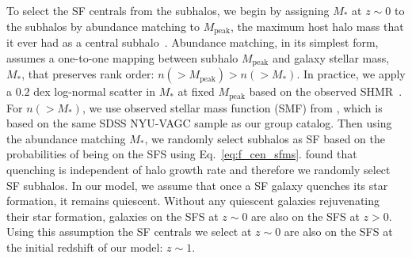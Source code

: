 \documentclass[12pt, letterpaper, preprint, tighten]{aastex62}
\begin{document}
To select the SF centrals from the subhalos, we begin by assigning $M_*$
at $z\sim 0$ to the subhalos by abundance matching to $M_\mathrm{peak}$,
the maximum host halo mass that it ever had as a central subhalo~\citep{conroy2006,vale2006,yang2009,wetzel2012,leja2013,wetzel2013,wetzel2014,hahn2017b}.
Abundance matching, in its simplest form, assumes a one-to-one mapping between subhalo
$M_\mathrm{peak}$ and galaxy stellar mass, $M_*$, that preserves rank
order: $n({>}M_\mathrm{peak}) > n({>}M_*)$. In practice, we apply a $0.2$
dex log-normal scatter in $M_*$ at fixed $M_\mathrm{peak}$ based on the
observed SHMR~\citep[\emph{e.g.}][]{mandelbaum2006a, more2011, velander2014, zu2015, gu2016, lange2018a}.
For $n({>}M_*)$, we use observed stellar mass function (SMF)
from \cite{li2009}, which is based on the same SDSS NYU-VAGC sample as our
group catalog. Then using the abundance matching $M_*$, we randomly select subhalos as
SF based on the probabilities of being on the SFS using Eq.~\ref{eq:f_cen_sfms}.
\cite{tinker2017b,tinker2018} found that quenching is
independent of halo growth rate and therefore we randomly select SF subhalos.
In our model, we assume that once a SF galaxy quenches its star formation,
it remains quiescent.  %
Without any quiescent galaxies rejuvenating their star formation, galaxies
on the SFS at $z\sim0$ are also on the SFS at $z > 0$. Using this assumption
the SF centrals we select at $z \sim 0$ are also on the SFS at the initial
redshift of our model: $z \sim 1$.
\end{document}
